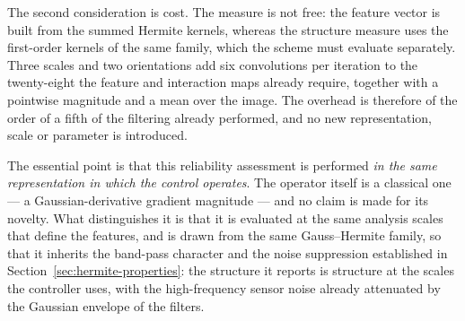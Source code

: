 The second consideration is cost. The measure is not free: the feature vector
is built from the summed Hermite kernels, whereas the structure measure uses
the first-order kernels of the same family, which the scheme must evaluate
separately. Three scales and two orientations add six convolutions per
iteration to the twenty-eight the feature and interaction maps already
require, together with a pointwise magnitude and a mean over the image. The
overhead is therefore of the order of a fifth of the filtering already
performed, and no new representation, scale or parameter is introduced.

The essential point is that this reliability assessment is performed \emph{in
the same representation in which the control operates}. The operator itself is
a classical one --- a Gaussian-derivative gradient magnitude --- and no claim
is made for its novelty. What distinguishes it is that it is evaluated at the
same analysis scales that define the features, and is drawn from the same
Gauss--Hermite family, so that it inherits the band-pass character and the
noise suppression established in Section~\ref{sec:hermite-properties}: the
structure it reports is structure at the scales the controller uses, with the
high-frequency sensor noise already attenuated by the Gaussian envelope of the
filters.

%

